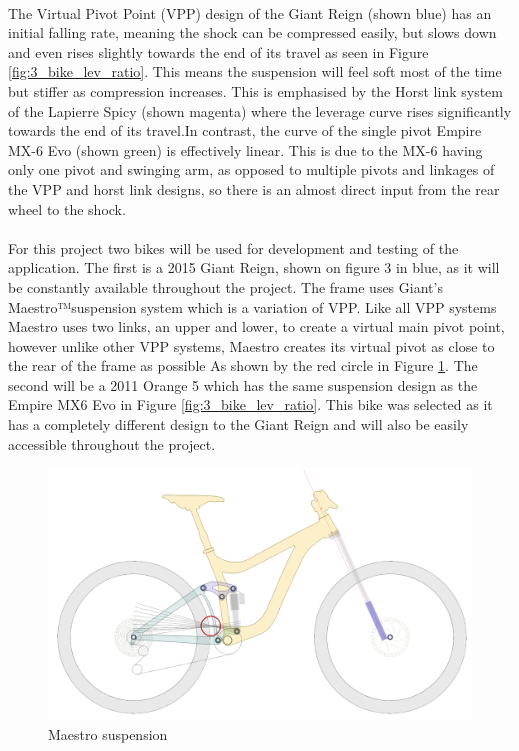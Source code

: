 		\\
		The Virtual Pivot Point (VPP) design of the Giant Reign (shown blue) has an initial falling rate, meaning the shock can be compressed easily, but slows down and even rises slightly towards the end of its travel as seen in Figure \ref{fig:3_bike_lev_ratio}. This means the suspension will feel soft most of the time but stiffer as compression increases. This is emphasised by the Horst link system of the Lapierre Spicy (shown magenta) where the leverage curve rises significantly towards the end of its travel.In contrast, the curve of the single pivot Empire MX-6 Evo (shown green) is effectively linear. This is due to the MX-6 having only one pivot and swinging arm, as opposed to multiple pivots and linkages of the VPP and horst link designs, so there is an almost direct input from the rear wheel to the shock. 
		\\\\
		For this project two bikes will be used for development and testing of the application. The first is a 2015 Giant Reign, shown on figure 3 in blue, as it will be constantly available throughout the project. The frame uses Giant’s Maestro™suspension system which is a variation of VPP. Like all VPP systems Maestro uses two links, an upper and lower, to create a virtual main pivot point, however unlike other VPP systems, Maestro creates its virtual pivot as close to the rear of the frame as possible As shown by the red circle in Figure \ref{fig:maestro}. The second will be a 2011 Orange 5 which has the same suspension design as the Empire MX6 Evo in Figure \ref{fig:3_bike_lev_ratio}. This bike was selected as it has a completely different design to the Giant Reign and will also be easily accessible throughout the project. 
		\begin{figure}[h!]
			\centering
			\includegraphics[width=12cm]{../images/reignsch.PNG}
			\caption{Maestro suspension}
			\label{fig:maestro}
		\end{figure}
